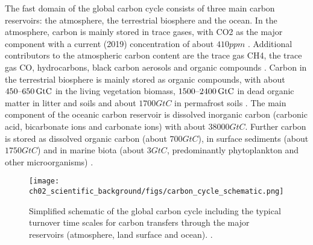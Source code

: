 The fast domain of the global carbon cycle consists of three main carbon
reservoirs: the atmosphere, the terrestrial biosphere and the ocean. In the
atmosphere, carbon is mainly stored in trace gases, with \ac{CO2} as the major
component with a current (2019) concentration of about $410 \unit{ppm}$
\autocite{Friedlingstein2020}. Additional contributors to the atmospheric
carbon content are the trace gas \ac{CH4}, the trace gas \ac{CO}, hydrocarbons,
black carbon aerosols and organic compounds \autocite{Ciais2013}. Carbon in the
terrestrial biosphere is mainly stored as organic compounds, with about
$\rangeunit{450}{650}{GtC}$ in the living vegetation biomass,
$\rangeunit{1500}{2400}{GtC}$ in dead organic matter in litter and soils and
about $1700 \unit{GtC}$ in permafrost soils \autocite{Ciais2013}. The main
component of the oceanic carbon reservoir is dissolved inorganic carbon
(carbonic acid, bicarbonate ions and carbonate ions) with about $38000
\unit{GtC}$. Further carbon is stored as dissolved organic carbon (about $700
\unit{GtC}$), in surface sediments (about $1750 \unit{GtC}$) and in marine
biota (about $3 \unit{GtC}$, predominantly phytoplankton and other
microorganisms) \autocite{Ciais2013, Friedlingstein2020}.

\begin{figure}[t]
  \centering
  \texttt{[image: 
    ch02\_scientific\_background/figs/carbon\_cycle\_schematic.png]}
  \caption[
    Simplified schematic of the global carbon cycle.
  ]{
    Simplified schematic of the global carbon cycle including the typical
    turnover time scales for carbon transfers through the major reservoirs
    (atmosphere, land surface and ocean). .
  }
  \label{fig:02:carbon_cycle_schematic}
\end{figure}

